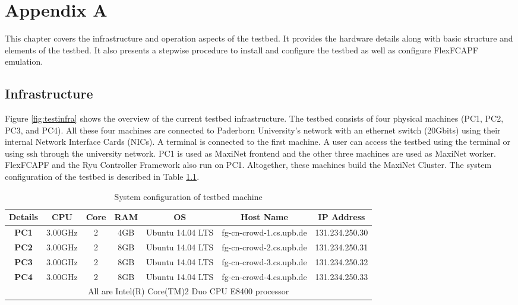 \newpage
\thispagestyle{empty}
\mbox{}


\chapter{Appendix A}\label{APPD-CHAP}
This chapter covers the infrastructure and operation aspects of the testbed. It provides the hardware details along with basic structure and elements of the testbed. It also presents a stepwise procedure to install and configure the testbed as well as configure FlexFCAPF emulation.

\section{Infrastructure}\label{sec:infra}
Figure \ref{fig:testinfra} shows the overview of the current testbed infrastructure. The testbed consists of four physical machines (PC1, PC2, PC3, and PC4). All these four machines are connected to Paderborn University's network with an ethernet switch (20Gbits) using their internal Network Interface Cards (NICs). A terminal is connected to the first machine. A user can access the testbed using the terminal or using ssh through the university network. PC1 is used as MaxiNet frontend and the other three machines are used as MaxiNet worker. FlexFCAPF and the Ryu Controller Framework also run on PC1. Altogether, these machines build the MaxiNet Cluster. The system configuration of the testbed is described in Table \ref{tab:sysconf}.

\begin{table}[h!]
	\centering
	\caption{System configuration of testbed machine}
	\label{tab:sysconf}
	{\footnotesize
	\begin{tabular}{|c|c|c|c|c|c|c|}
		\hline
		\textbf{Details} & \textbf{CPU} & \textbf{Core} & \textbf{RAM} & \textbf{OS} & \textbf{Host Name} & \textbf{IP Address}\\
		\hline
		\textbf{PC1} & 3.00GHz & 2 & 4GB & Ubuntu 14.04 LTS & fg-cn-crowd-1.cs.upb.de & 131.234.250.30\\
		\hline
		\textbf{PC2} & 3.00GHz & 2 & 8GB & Ubuntu 14.04 LTS & fg-cn-crowd-2.cs.upb.de & 131.234.250.31\\
		\hline
		\textbf{PC3} & 3.00GHz & 2 & 8GB & Ubuntu 14.04 LTS & fg-cn-crowd-3.cs.upb.de & 131.234.250.32\\
		\hline
		\textbf{PC4} & 3.00GHz & 2 & 8GB & Ubuntu 14.04 LTS & fg-cn-crowd-4.cs.upb.de & 131.234.250.33\\
		\hline
		\multicolumn{7}{|c|}{All are Intel(R) Core(TM)2 Duo CPU E8400 processor}\\
		\hline
	\end{tabular}
	}
\end{table}

